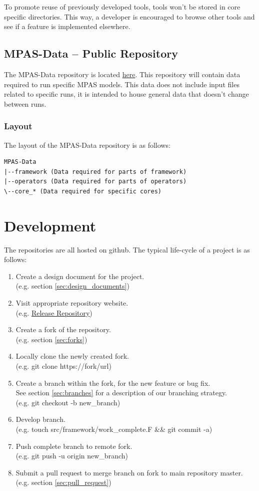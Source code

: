 \documentclass[11pt]{report}
\begin{document}
To promote reuse of previously developed tools, tools won't be stored in core
specific directories. This way, a developer is encouraged to browse other tools
and see if a feature is implemented elsewhere.

\section{MPAS-Data -- Public Repository} 
The MPAS-Data repository is located \href{https://github.com/MPAS-Dev/MPAS-Data}{here}. This repository
will contain data required to run specific MPAS models. This data does not
include input files related to specific runs, it is intended to house general
data that doesn't change between runs.

\subsection{Layout}
The layout of the MPAS-Data repository is as follows:
\begin{lstlisting}
MPAS-Data
|--framework (Data required for parts of framework)
|--operators (Data required for parts of operators)
\--core_* (Data required for specific cores)
\end{lstlisting}

\chapter{Development}
The repositories are all hosted on github. The typical life-cycle of a project is as follows:
\begin{enumerate}
	\item Create a design document for the project. \\
		  (e.g. section \ref{sec:design_documents})
	\item Visit appropriate repository website. \\
		  (e.g. \href{https://github.com/MPAS-Dev/MPAS-Release}{Release Repository})
	\item Create a fork of the repository. \\
		  (e.g. section \ref{sec:forks})
	\item Locally clone the newly created fork. \\
		  (e.g. git clone https://fork/url)
	\item Create a branch within the fork, for the new feature or bug fix. \\
		  See section  \ref{sec:branches} for a description of our branching strategy. \\
		  (e.g. git checkout -b new\_branch)
	\item Develop branch. \\
		  (e.g. touch src/framework/work\_complete.F \&\& git commit -a)
	\item Push complete branch to remote fork. \\
		  (e.g. git push -u origin new\_branch)
	\item Submit a pull request to merge branch on fork to main repository master. \\
		  (e.g. section \ref{sec:pull_request})
\end{enumerate}
\end{document}
